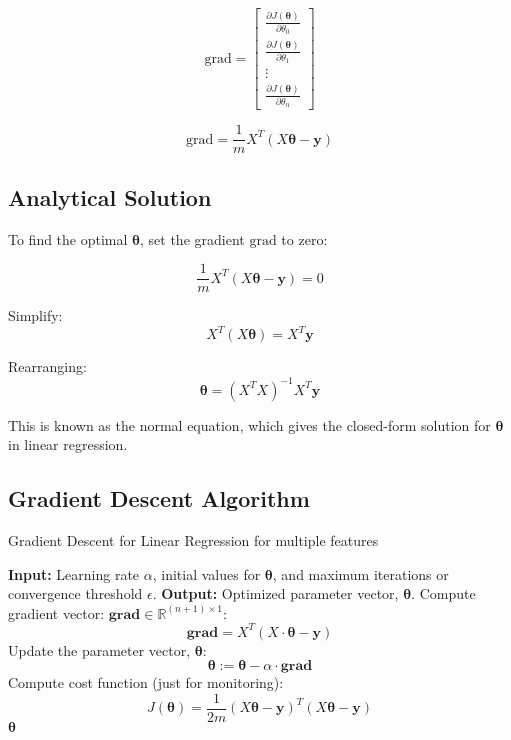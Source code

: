 \begin{equation}
    \text{grad} = \begin{bmatrix}
\frac{\partial J(\boldsymbol{\theta})}{\partial \theta_0} \\
\frac{\partial J(\boldsymbol{\theta})}{\partial \theta_1} \\
\vdots \\
\frac{\partial J(\boldsymbol{\theta})}{\partial \theta_n}
\end{bmatrix}
\end{equation}

\begin{equation}
    \text{grad} = \frac{1}{m} X^T (X  \boldsymbol{\theta} - \mathbf{y})
\end{equation}

\subsection{Analytical Solution}

To find the optimal \(\boldsymbol{\theta}\), set the gradient \(\text{grad}\) to zero:

\[
\frac{1}{m} X^T (X \boldsymbol{\theta} - \mathbf{y}) = 0
\]

Simplify:
\[
X^T (X \boldsymbol{\theta}) = X^T \mathbf{y}
\]

Rearranging:
\begin{equation}
\boldsymbol{\theta} = (X^T X)^{-1} X^T \mathbf{y}
\end{equation}

This is known as the normal equation, which gives the closed-form solution for \(\boldsymbol{\theta}\) in
linear regression.

\subsection{Gradient Descent Algorithm}

\begin{algorithm}[h!]
\caption{Gradient Descent for Linear Regression for multiple features}
\begin{algorithmic}[1]
\STATE \textbf{Input:} Learning rate $\alpha$, initial values for $\boldsymbol{\theta}$, and maximum iterations or
convergence threshold $\epsilon$.
\STATE \textbf{Output:} Optimized parameter vector, $\boldsymbol{\theta}$.
\REPEAT
    \STATE Compute gradient vector: $\textbf{grad} \in \mathbb{R}^{(n+1) \times 1}$:
    \[
        \textbf{grad} = X^T (X \cdot \boldsymbol{\theta} - \mathbf{y})
    \]
    \STATE Update the parameter vector, $\boldsymbol{\theta}$:
    \[
        \boldsymbol{\theta} := \boldsymbol{\theta} - \alpha \cdot \textbf{grad}
    \]
    \STATE Compute cost function (just for monitoring):
    \[
    J(\boldsymbol{\theta}) = \frac{1}{2m} (X \boldsymbol{\theta} - \mathbf{y})^T (X \boldsymbol{\theta} - \mathbf{y})
    \]
\RETURN $\boldsymbol{\theta}$
\end{algorithmic}
\end{algorithm}

